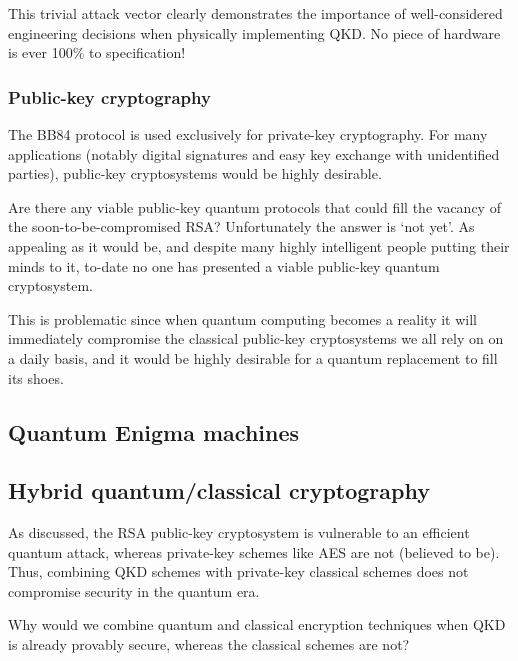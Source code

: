 This trivial attack vector clearly demonstrates the importance of well-considered engineering decisions when physically implementing QKD. No piece of hardware is ever 100\% to specification!


\subsubsection{Public-key cryptography}

The BB84 protocol is used exclusively for private-key cryptography. For many applications (notably digital signatures and easy key exchange with unidentified parties), public-key cryptosystems would be highly desirable.

Are there any viable public-key quantum protocols that could fill the vacancy of the soon-to-be-compromised RSA? Unfortunately the answer is `not yet'. As appealing as it would be, and despite many highly intelligent people putting their minds to it, to-date no one has presented a viable public-key quantum cryptosystem.

This is problematic since when quantum computing becomes a reality it will immediately compromise the classical public-key cryptosystems we all rely on on a daily basis, and it would be highly desirable for a quantum replacement to fill its shoes.

%
%

\subsection{Quantum Enigma machines}


%
%

\subsection{Hybrid quantum/classical cryptography}

As discussed, the RSA public-key cryptosystem is vulnerable to an efficient quantum attack, whereas private-key schemes like AES are not (believed to be). Thus, combining QKD schemes with private-key classical schemes does not compromise security in the quantum era.

Why would we combine quantum and classical encryption techniques when QKD is already provably secure, whereas the classical schemes are not?

